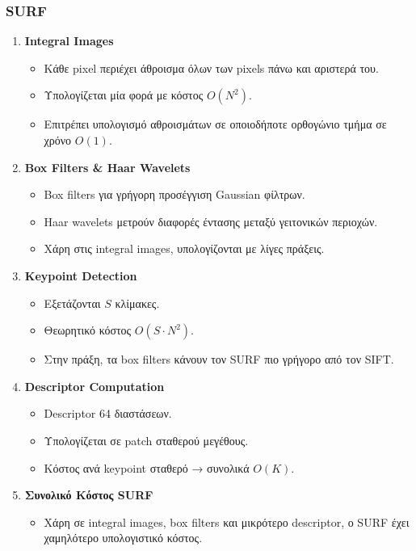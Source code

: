 \documentclass[12pt]{article}
\begin{document}
\subsubsection{SURF}
\begin{enumerate}
    \item \textbf{Integral Images}
    \begin{itemize}
        \item Κάθε pixel περιέχει άθροισμα όλων των pixels πάνω και αριστερά του.
        \item Υπολογίζεται μία φορά με κόστος $O(N^2)$.
        \item Επιτρέπει υπολογισμό αθροισμάτων σε οποιοδήποτε ορθογώνιο τμήμα σε χρόνο $O(1)$.
    \end{itemize}

    \item \textbf{Box Filters \& Haar Wavelets}
    \begin{itemize}
        \item Box filters για γρήγορη προσέγγιση Gaussian φίλτρων.
        \item Haar wavelets μετρούν διαφορές έντασης μεταξύ γειτονικών περιοχών.
        \item Χάρη στις integral images, υπολογίζονται με λίγες πράξεις.
    \end{itemize}

    \item \textbf{Keypoint Detection}
    \begin{itemize}
        \item Εξετάζονται $S$ κλίμακες.
        \item Θεωρητικό κόστος $O(S \cdot N^2)$.
        \item Στην πράξη, τα box filters κάνουν τον SURF πιο γρήγορο από τον SIFT.
    \end{itemize}

    \item \textbf{Descriptor Computation}
    \begin{itemize}
        \item Descriptor 64 διαστάσεων.
        \item Υπολογίζεται σε patch σταθερού μεγέθους.
        \item Κόστος ανά keypoint σταθερό → συνολικά $O(K)$.
    \end{itemize}

    \item \textbf{Συνολικό Κόστος SURF}
    \begin{itemize}
        \item Χάρη σε integral images, box filters και μικρότερο descriptor, ο SURF έχει χαμηλότερο υπολογιστικό κόστος.
    \end{itemize}
\end{enumerate}
\end{document}
